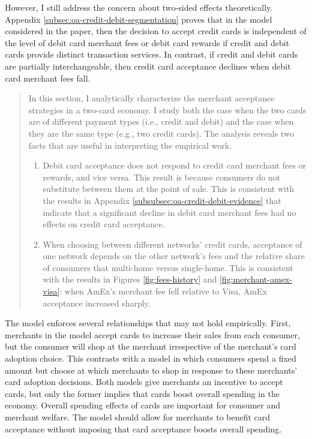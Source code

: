 \documentclass[main.tex]{subfiles}
\begin{document}
\begin{refsection}
However, I still address the concern about two-sided effects theoretically.
Appendix \ref{subsec:oa-credit-debit-segmentation} proves that in the model considered in the paper, then the decision to accept credit cards is independent of the level of debit card merchant fees or debit card rewards if credit and debit cards provide distinct transaction services.
In contrast, if credit and debit cards are partially interchangeable, then credit card acceptance declines when debit card merchant fees fall.

\begin{quotation}
    In this section, I analytically characterize the merchant acceptance
strategies in a two-card economy.
I study both the case when the two
cards are of different payment types (i.e., credit and debit) and
the case when they are the same type (e.g., two credit cards).
The
analysis reveals two facts that are useful in interpreting the empirical
work.
\begin{enumerate}
    \item Debit card acceptance does not respond to credit card merchant fees or rewards,
    and vice versa.
This result is because consumers do not substitute between
    them at the point of sale.
This is consistent with the results in Appendix
    \ref{subsubsec:oa-credit-debit-evidence} that indicate that a significant
    decline in debit card merchant fees had no effects on credit card
    acceptance.
    \item When choosing between different networks' credit cards, acceptance
    of one network depends on the other network's fees and the relative
    share of consumers that multi-home versus single-home.
This is consistent
    with the results in Figures \ref{fig:fees-history} and \ref{fig:merchant-amex-visa}: when
    AmEx's merchant fee fell relative to Visa, AmEx acceptance increased
    sharply. 
    \end{enumerate}
\end{quotation}

\begin{refcommentnoclear}
The model enforces several relationships that may not hold empirically.
First, merchants in the model accept cards to increase their sales from each consumer, but the consumer will shop at the merchant irrespective of the merchant's card adoption choice.
This contrasts with a model in which consumers spend a fixed amount but choose at which merchants to shop in response to these merchants' card adoption decisions.
Both models give merchants an incentive to accept cards, but only the former implies that cards boost overall spending in the economy.
Overall spending effects of cards are important for consumer and merchant welfare.
The model should allow for merchants to benefit card acceptance without imposing that card acceptance boosts overall spending.
\end{refcommentnoclear}


\end{refsection}
\end{document}
